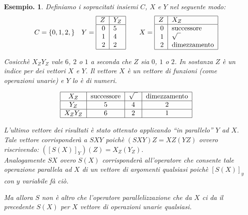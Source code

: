 \documentclass{book}
\newtheorem{esempio}{Esempio.}
\begin{document}
\begin{esempio}Definiamo i sopracitati insiemi $C$, $X$ e $Y$ nel seguente 
modo:
\[
C = \{0, 1, 2, \} \quad
Y = 
\begin{tabular}{|r|l|}
  \hline
  $Z$ & $Y_{Z}$ \\
  \hline
  0 & 5 \\
  1 & 4 \\
  2 & 2 \\
  \hline
\end{tabular}
\qquad
X = 
\begin{tabular}{|r|l|}
  \hline
  $Z$ & $X_{Z}$ \\
  \hline
  $0$ & successore \\
  $1$ & $\sqrt{\phantom{1}}$ \\
  $2$ & dimezzamento \\
  \hline
\end{tabular}
\]

Cosicch\`e $X_{Z}Y_{Z}$ vale $6$, $2$ o $1$ a seconda che $Z$ sia $0$, $1$ o
$2$. In sostanza $Z$ \`e un indice per dei vettori $X$ e $Y$. Il vettore $X$
\`e un vettore di funzioni (come operazioni unarie) e $Y$ lo \`e di numeri.

\[
\begin{tabular}{|c|c|c|c|}
  \hline
  $X_{Z}$ & successore & $\sqrt{\phantom{1}}$ & dimezzamento \\
  \hline
  $Y_{Z}$ & $5$ & $4$ & $2$ \\
  \hline
  $X_{Z}Y_{Z}$ & $6$ & $2$ & $1$ \\
  \hline
\end{tabular}
\]

\vspace{0.3 cm}
L'ultimo vettore dei risultati \`e stato ottenuto applicando ``in parallelo''
$Y$ ad $X$. Tale vettore corrisponder\`a a $SXY$ poich\`e $(SXY)Z = XZ(YZ)$
ovvero riscrivendo: $([S(X)]_{Y})(Z) = X_{Z}(Y_{Z})$.\\Analogamente $SX$ overo
$S(X)$ corrisponder\`a all'operatore che consente tale operazione parallela ad
$X$ di un vettore di argomenti qualsiasi poich\`e $[S(X)]_{y}$ con $y$
variabile f\`a ci\`o.

Ma allora $S$ non \`e altro che l'operatore \emph{parallelizzazione} che da
$X$ ci da il precedente $S(X)$ per $X$ vettore di operazioni unarie qualsiasi.
\end{esempio}
\end{document}

